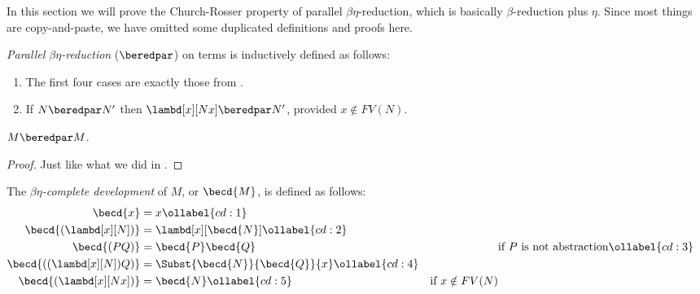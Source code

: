 \documentclass[../../../include/open-logic-section]{subfiles}
\begin{document}


In this section we will prove the Church-Rosser property of parallel
$\beta\eta$-reduction, which is basically $\beta$-reduction plus
$\eta$. Since most things are copy-and-paste, we have omitted some
duplicated definitions and proofs here.

\begin{defn} 
  \emph{Parallel $\beta\eta$-reduction} ($\beredpar$) on terms is inductively defined as follows:
  \begin{enumerate}
    \item The first four cases are exactly those from .
    \item {} If $N \beredpar N'$ then $\lambd[x][Nx]
      \beredpar N'$, provided $x \notin FV(N)$.
  \end{enumerate}
\end{defn}

\begin{thm}
  $M \beredpar M$.
\end{thm}
\begin{proof}
  Just like what we did in .
\end{proof}

\begin{defn}
  The \emph{$\beta\eta$-complete development} of $M$, or $\becd{M}$, is defined
  as follows:
  \begin{align}
    \becd{x} &= x \ollabel{cd:1} \\
    \becd{(\lambd[x][N])} &= \lambd[x][\becd{N}] \ollabel{cd:2}\\
    \becd{(PQ)} &= \becd{P}\becd{Q} && \text{if $P$ is not abstraction} \ollabel{cd:3} \\
    \becd{((\lambd[x][N])Q)} &= \Subst{\becd{N}}{\becd{Q}}{x}
                             \ollabel{cd:4} \\
    \becd{(\lambd[x][Nx])} &= \becd{N} \ollabel{cd:5} & \text{if $x
                                                      \notin FV(N)$}
  \end{align}
\end{defn}
\end{document}
